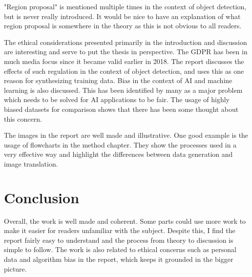 \documentclass[10pt,a4paper]{scrartcl}
\begin{document}
	"Region proposal" is mentioned multiple times in the context of object detection, but is never really introduced. It would be nice to have an explanation of what region proposal is somewhere in the theory as this is not obvious to all readers.
	
	The ethical considerations presented primarily in the introduction and discussion are interesting and serve to put the thesis in perspective. The GDPR has been in much media focus since it became valid earlier in 2018. The report discusses the effects of such regulation in the context of object detection, and uses this as one reason for synthesizing training data. Bias in the context of AI and machine learning is also discussed. This has been identified by many as a major problem which needs to be solved for AI applications to be fair. The usage of highly biased datasets for comparison shows that there has been some thought about this concern.
	
	The images in the report are well made and illustrative. One good example is the usage of flowcharts in the method chapter. They show the processes used in a very effective way and highlight the differences between data generation and image translation.
	
	\section*{Conclusion}
	Overall, the work is well made and coherent. Some parts could use more work to make it easier for readers unfamiliar with the subject. Despite this, I find the report fairly easy to understand and the process from theory to discussion is simple to follow. The work is also related to ethical concerns such as personal data and algorithm bias in the report, which keeps it grounded in the bigger picture.
	
\end{document}
